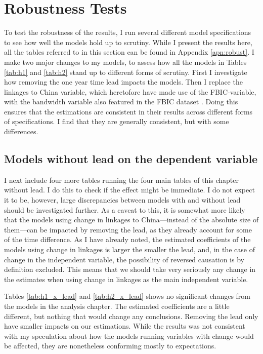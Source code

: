\section{Robustness Tests} \label{sec:robust}
To test the robustness of the results, I run several different model specifications to see how well the models hold up to scrutiny. While I present the results here, all the tables referred to in this section can be found in Appendix \ref{apn:robust}. I make two major changes to my models, to assess how all the models in Tables \ref{tab:h1} and \ref{tab:h2} stand up to different forms of scrutiny. First I investigate how removing the one year time lead impacts the models. Then I replace the linkages to China variable, which heretofore have made use of the FBIC-variable, with the bandwidth variable also featured in the FBIC dataset \citep{moyer_china-us_2021}. Doing this ensures that the estimations are consistent in their results across different forms of specifications. I find that they are generally consistent, but with some differences.

\subsection{Models without lead on the dependent variable}
I next include four more tables running the four main tables of this chapter without lead. I do this to check if the effect might be immediate. I do not expect it to be, however, large discrepancies between models with and without lead should be investigated further. As a caveat to this, it is somewhat more likely that the models using change in linkages to China---instead of the absolute size of them---can be impacted by removing the lead, as they already account for some of the time difference. As I have already noted, the estimated coefficients of the models using change in linkages is larger the smaller the lead, and, in the case of change in the independent variable, the possibility of reversed causation is by definition excluded. This means that we should take very seriously any change in the estimates when using change in linkages as the main independent variable.

Tables \ref{tab:h1_x_lead} and \ref{tab:h2_x_lead} shows no significant changes from the models in the analysis chapter. The estimated coefficients are a little different, but nothing that would change any conclusions. Removing the lead only have smaller impacts on our estimations. While the results was not consistent with my speculation about how the models running variables with change would be affected, they are nonetheless conforming mostly to expectations.


